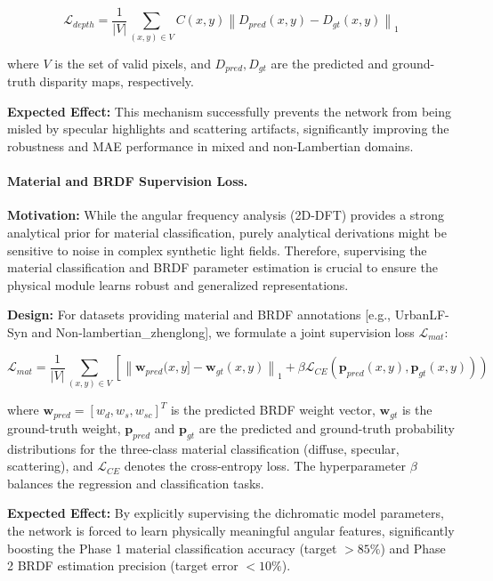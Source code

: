 \documentclass[lettersize,journal]{IEEEtran}
\begin{document}
\begin{equation}
\label{eq:eq22}
\mathcal{L}_{depth} = \frac{1}{|V|} \sum_{(x,y) \in V} C(x,y) \left\| D_{pred}(x,y) - D_{gt}(x,y) \right\|_1
\end{equation}

where $V$ is the set of valid pixels, and $D_{pred}, D_{gt}$ are the predicted and ground-truth disparity maps, respectively. 

\textbf{Expected Effect:} This mechanism successfully prevents the network from being misled by specular highlights and scattering artifacts, significantly improving the robustness and MAE performance in mixed and non-Lambertian domains.

\paragraph{Material and BRDF Supervision Loss.}
\textbf{Motivation:} While the angular frequency analysis (2D-DFT) provides a strong analytical prior for material classification, purely analytical derivations might be sensitive to noise in complex synthetic light fields. Therefore, supervising the material classification and BRDF parameter estimation is crucial to ensure the physical module learns robust and generalized representations.

\textbf{Design:} For datasets providing material and BRDF annotations  [e.g., UrbanLF-Syn and Non-lambertian_zhenglong], we formulate a joint supervision loss $\mathcal{L}_{mat}$:

\begin{equation}
\label{eq:eq23}
\mathcal{L}_{mat} = \frac{1}{|V|} \sum_{(x,y) \in V} \left [ \left\| \mathbf{w}_{pred}(x,y] - \mathbf{w}_{gt}(x,y) \right\|_1 + \beta \mathcal{L}_{CE}(\mathbf{p}_{pred}(x,y), \mathbf{p}_{gt}(x,y)) \right)
\end{equation}

where $\mathbf{w}_{pred} = [w_d, w_s, w_{sc}]^T$ is the predicted BRDF weight vector, $\mathbf{w}_{gt}$ is the ground-truth weight, $\mathbf{p}_{pred}$ and $\mathbf{p}_{gt}$ are the predicted and ground-truth probability distributions for the three-class material classification (diffuse, specular, scattering), and $\mathcal{L}_{CE}$ denotes the cross-entropy loss. The hyperparameter $\beta$ balances the regression and classification tasks.

\textbf{Expected Effect:} By explicitly supervising the dichromatic model parameters, the network is forced to learn physically meaningful angular features, significantly boosting the Phase 1 material classification accuracy (target $>85\%$) and Phase 2 BRDF estimation precision (target error $<10\%$).
\end{document}
